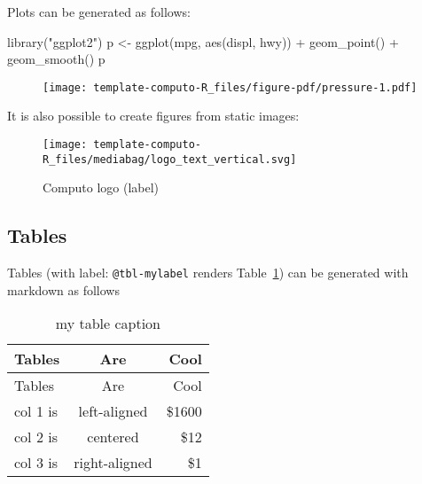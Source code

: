 \documentclass[
  11pt,
  a4paper,
]{article}
\newenvironment{Shaded}{}{}
\newcommand{\FunctionTok}[1]{\textcolor[rgb]{0.44,0.26,0.76}{#1}}
\newcommand{\NormalTok}[1]{\textcolor[rgb]{0.14,0.16,0.18}{#1}}
\newcommand{\OtherTok}[1]{\textcolor[rgb]{0.44,0.26,0.76}{#1}}
\newcommand{\SpecialCharTok}[1]{\textcolor[rgb]{0.00,0.36,0.77}{#1}}
\newcommand{\StringTok}[1]{\textcolor[rgb]{0.01,0.18,0.38}{#1}}
\theoremstyle{plain}
\theoremstyle{remark}
\begin{document}
Plots can be generated as follows:

\begin{Shaded}
\begin{Highlighting}[]
\FunctionTok{library}\NormalTok{(}\StringTok{"ggplot2"}\NormalTok{)}
\NormalTok{p }\OtherTok{\textless{}{-}} \FunctionTok{ggplot}\NormalTok{(mpg, }\FunctionTok{aes}\NormalTok{(displ, hwy)) }\SpecialCharTok{+}
  \FunctionTok{geom\_point}\NormalTok{() }\SpecialCharTok{+}
  \FunctionTok{geom\_smooth}\NormalTok{()}
\NormalTok{p}
\end{Highlighting}
\end{Shaded}

\begin{figure}[H]

{\centering \texttt{[image: template-computo-R\_files/figure-pdf/pressure-1.pdf]}

}

\end{figure}

It is also possible to create figures from static images:

\begin{figure}

{\centering 

\texttt{[image: template-computo-R\_files/mediabag/logo\_text\_vertical.svg]}

}

\caption{\label{fig-logo}Computo logo (label)}

\end{figure}

\hypertarget{tables}{%
\subsection{Tables}\label{tables}}

Tables (with label: \texttt{@tbl-mylabel} renders
Table~\ref{tbl-mylabel}) can be generated with markdown as follows

\hypertarget{tbl-mylabel}{}
\begin{longtable}[]{@{}lcr@{}}
\caption{\label{tbl-mylabel}my table caption}\tabularnewline
\toprule()
Tables & Are & Cool \\
\midrule()
\endfirsthead
\toprule()
Tables & Are & Cool \\
\midrule()
\endhead
col 1 is & left-aligned & \$1600 \\
col 2 is & centered & \$12 \\
col 3 is & right-aligned & \$1 \\
\bottomrule()
\end{longtable}
\end{document}
